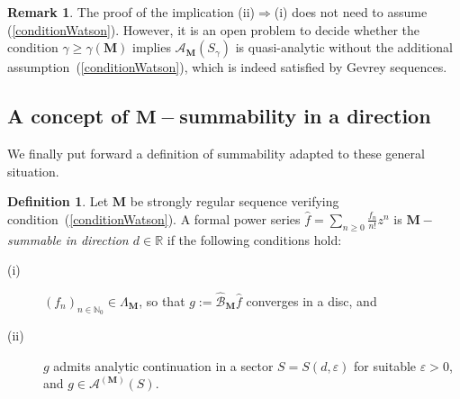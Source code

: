 \documentclass[11pt,a4paper,leqno]{article}
\theoremstyle{plain}
\theoremstyle{definition}
\newtheorem{defin}[theo]{Definition}
\newtheorem{rem}[theo]{Remark}
\def\N{\mathbb{N}}
\def\R{\mathbb{R}}
\def\bM{\boldsymbol{M}}
\begin{document}
\begin{rem}
The proof of the implication (ii)$\Rightarrow$(i) does not need to assume (\ref{conditionWatson}). However, it is an open problem to decide whether the condition $\gamma\ge\gamma(\bM)$ implies $\mathcal{A}_{\bM}(S_{\gamma})$ is quasi-analytic without the additional assumption~(\ref{conditionWatson}), which is indeed satisfied by Gevrey sequences.
\end{rem}

\subsection{A concept of $\bM-$summability in a direction}

\noindent We finally put forward a definition of summability adapted to these general situation.

\begin{defin}
Let $\bM$ be strongly regular sequence verifying condition~(\ref{conditionWatson}). A formal power series $\hat{f}=\sum_{n\ge 0}\displaystyle\frac{f_n}{n!}z^n$ is \textit{$\bM-$summable in direction $d\in\R$} if the following conditions hold:
 \begin{description}
 \item[(i)] $(f_n)_{n\in\N_0}\in\Lambda_{\bM}$, so that $g:=
\hat{\mathcal{B}}_{\bM}\hat{f}$ converges in a disc, and
\item[(ii)] $g$ admits analytic continuation in a sector $S=S(d,\varepsilon)$ for suitable $\varepsilon>0$, and $g\in\mathcal{A}^{(\bM)}(S)$.
\end{description}
\end{defin}
\end{document}
